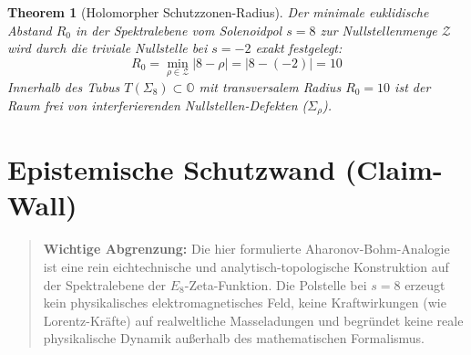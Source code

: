 \documentclass[11pt,a4paper]{article}
\newtheorem{theorem}{Theorem}
\begin{document}
\begin{theorem}[Holomorpher Schutzzonen-Radius]
Der minimale euklidische Abstand $R_0$ in der Spektralebene vom Solenoidpol $s=8$ zur Nullstellenmenge $\mathcal{Z}$ wird durch die triviale Nullstelle bei $s=-2$ exakt festgelegt:
\begin{equation}
R_0 = \min_{\rho \in \mathcal{Z}} |8 - \rho| = |8 - (-2)| = 10
\end{equation}
Innerhalb des Tubus $T(\Sigma_8) \subset \mathbb{O}$ mit transversalem Radius $R_0 = 10$ ist der Raum frei von interferierenden Nullstellen-Defekten ($\Sigma_\rho$).
\end{theorem}

\section{Epistemische Schutzwand (Claim-Wall)}

\begin{quote}
\small\textbf{Wichtige Abgrenzung:} Die hier formulierte Aharonov-Bohm-Analogie ist eine rein eichtechnische und analytisch-topologische Konstruktion auf der Spektralebene der $E_8$-Zeta-Funktion. Die Polstelle bei $s=8$ erzeugt kein physikalisches elektromagnetisches Feld, keine Kraftwirkungen (wie Lorentz-Kräfte) auf realweltliche Masseladungen und begründet keine reale physikalische Dynamik außerhalb des mathematischen Formalismus.
\end{quote}
\end{document}
